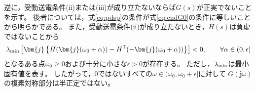 \documentclass[tombow,dvipdfmx]{corona-a5-1.1}
\begin{document}
\begin{証明}
逆に，受動送電条件(ii)または(iii)が成り立たないならば$G(s)$が正実でないことを示す。
後者については，式\ref{eq:pdsp}の条件が式\ref{eq:cndG0}の条件に等しいことから明らかである。
また，受動送電条件(ii)が成り立たないとき，$H(s)$は負虚ではないことから
\begin{align*}
\lambda_{\rm min}\left[
\bm{j}
\left\{
H(\bm{j}(\omega_0 + \alpha )) - H^{\sf T}(-\bm{j}(\omega_0 + \alpha ))
\right\}
\right] < 0
,\qquad
\forall \alpha \in (0,\epsilon] 
\end{align*}
となるある点$\omega_0\geq 0$および十分に小さな$\epsilon >0$が存在する。
ただし，$\lambda_{\rm min}$は最小固有値を表す。
したがって，0ではないすべての$\omega \in (\omega_0, \omega_0+\epsilon] $に対して
$G(\bm{j} \omega) $の複素対称部分は半正定ではない。
\end{証明}
\end{document}
